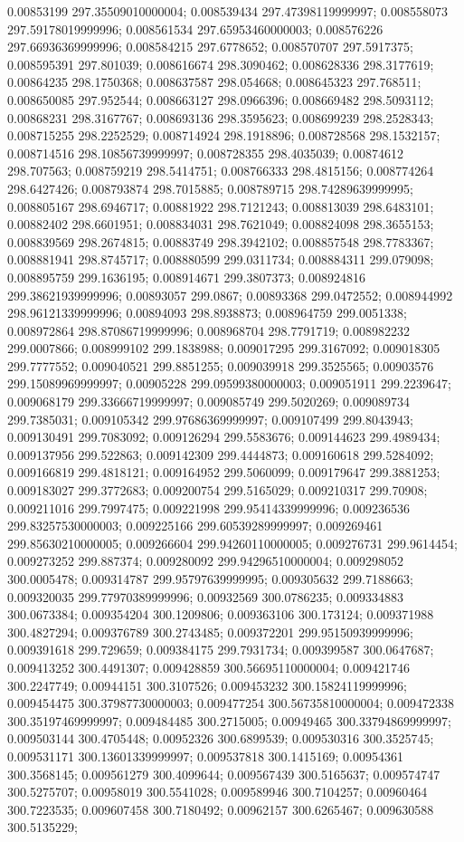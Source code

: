 0.00853199 297.35509010000004; 0.008539434 297.47398119999997; 0.008558073 297.59178019999996; 0.008561534 297.65953460000003; 0.008576226 297.66936369999996; 0.008584215 297.6778652; 0.008570707 297.5917375; 0.008595391 297.801039; 0.008616674 298.3090462; 0.008628336 298.3177619; 0.00864235 298.1750368; 0.008637587 298.054668; 0.008645323 297.768511; 0.008650085 297.952544; 0.008663127 298.0966396; 0.008669482 298.5093112; 0.00868231 298.3167767; 0.008693136 298.3595623; 0.008699239 298.2528343; 0.008715255 298.2252529; 0.008714924 298.1918896; 0.008728568 298.1532157; 0.008714516 298.10856739999997; 0.008728355 298.4035039; 0.00874612 298.707563; 0.008759219 298.5414751; 0.008766333 298.4815156; 0.008774264 298.6427426; 0.008793874 298.7015885; 0.008789715 298.74289639999995; 0.008805167 298.6946717; 0.00881922 298.7121243; 0.008813039 298.6483101; 0.00882402 298.6601951; 0.008834031 298.7621049; 0.008824098 298.3655153; 0.008839569 298.2674815; 0.00883749 298.3942102; 0.008857548 298.7783367; 0.008881941 298.8745717; 0.008880599 299.0311734; 0.008884311 299.079098; 0.008895759 299.1636195; 0.008914671 299.3807373; 0.008924816 299.38621939999996; 0.00893057 299.0867; 0.00893368 299.0472552; 0.008944992 298.96121339999996; 0.00894093 298.8938873; 0.008964759 299.0051338; 0.008972864 298.87086719999996; 0.008968704 298.7791719; 0.008982232 299.0007866; 0.008999102 299.1838988; 0.009017295 299.3167092; 0.009018305 299.7777552; 0.009040521 299.8851255; 0.009039918 299.3525565; 0.00903576 299.15089969999997; 0.00905228 299.09599380000003; 0.009051911 299.2239647; 0.009068179 299.33666719999997; 0.009085749 299.5020269; 0.009089734 299.7385031; 0.009105342 299.97686369999997; 0.009107499 299.8043943; 0.009130491 299.7083092; 0.009126294 299.5583676; 0.009144623 299.4989434; 0.009137956 299.522863; 0.009142309 299.4444873; 0.009160618 299.5284092; 0.009166819 299.4818121; 0.009164952 299.5060099; 0.009179647 299.3881253; 0.009183027 299.3772683; 0.009200754 299.5165029; 0.009210317 299.70908; 0.009211016 299.7997475; 0.009221998 299.95414339999996; 0.009236536 299.83257530000003; 0.009225166 299.60539289999997; 0.009269461 299.85630210000005; 0.009266604 299.94260110000005; 0.009276731 299.9614454; 0.009273252 299.887374; 0.009280092 299.94296510000004; 0.009298052 300.0005478; 0.009314787 299.95797639999995; 0.009305632 299.7188663; 0.009320035 299.77970389999996; 0.00932569 300.0786235; 0.009334883 300.0673384; 0.009354204 300.1209806; 0.009363106 300.173124; 0.009371988 300.4827294; 0.009376789 300.2743485; 0.009372201 299.95150939999996; 0.009391618 299.729659; 0.009384175 299.7931734; 0.009399587 300.0647687; 0.009413252 300.4491307; 0.009428859 300.56695110000004; 0.009421746 300.2247749; 0.00944151 300.3107526; 0.009453232 300.15824119999996; 0.009454475 300.37987730000003; 0.009477254 300.56735810000004; 0.009472338 300.35197469999997; 0.009484485 300.2715005; 0.00949465 300.33794869999997; 0.009503144 300.4705448; 0.00952326 300.6899539; 0.009530316 300.3525745; 0.009531171 300.13601339999997; 0.009537818 300.1415169; 0.00954361 300.3568145; 0.009561279 300.4099644; 0.009567439 300.5165637; 0.009574747 300.5275707; 0.00958019 300.5541028; 0.009589946 300.7104257; 0.00960464 300.7223535; 0.009607458 300.7180492; 0.00962157 300.6265467; 0.009630588 300.5135229; 